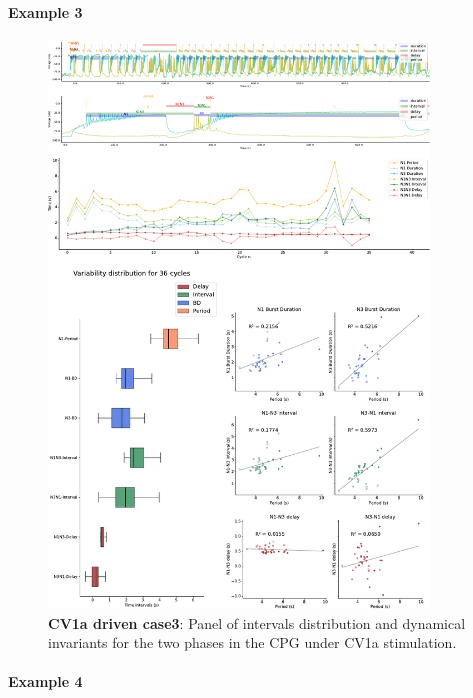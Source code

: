 \paragraph{Example 3}


\begin{figure}[htbp]
	\centering
	\includegraphics[width=0.9\textwidth]{./invariants/data/SUSSEX/CV1a_driven3/images/panel_with_intervals.pdf}
	\caption{\textbf{CV1a driven case3}: Panel of intervals distribution and dynamical invariants for the two phases in the CPG under CV1a stimulation.}
	\label{fig:cv1a 3 2phases}
\end{figure}



\paragraph{Example 4}

